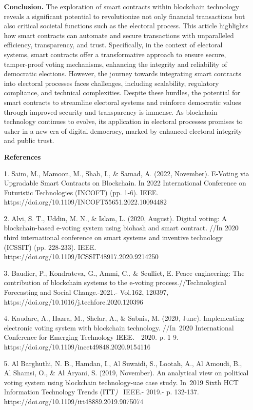 \textbf{Conclusion.} The exploration of smart contracts within
blockchain technology reveals a significant potential to revolutionize
not only financial transactions but also critical societal functions
such as the electoral process. This article highlights how smart
contracts can automate and secure transactions with unparalleled
efficiency, transparency, and trust. Specifically, in the context of
electoral systems, smart contracts offer a transformative approach to
ensure secure, tamper-proof voting mechanisms, enhancing the integrity
and reliability of democratic elections. However, the journey towards
integrating smart contracts into electoral processes faces challenges,
including scalability, regulatory compliance, and technical
complexities. Despite these hurdles, the potential for smart contracts
to streamline electoral systems and reinforce democratic values through
improved security and transparency is immense. As blockchain technology
continues to evolve, its application in electoral processes promises to
usher in a new era of digital democracy, marked by enhanced electoral
integrity and public trust.

\textbf{References}

1. Saim, M., Mamoon, M., Shah, I., \& Samad, A. (2022, November).
E-Voting via Upgradable Smart Contracts on Blockchain. In 2022
International Conference on Futuristic Technologies (INCOFT) (pp. 1-6).
IEEE. https://doi.org/10.1109/INCOFT55651.2022.10094482

2. Alvi, S. T., Uddin, M. N., \& Islam, L. (2020, August). Digital
voting: A blockchain-based e-voting system using biohash and smart
contract. //In 2020 third international conference on smart systems and
inventive technology (ICSSIT) (pp. 228-233). IEEE.
https://doi.org/10.1109/ICSSIT48917.2020.9214250

3. Baudier, P., Kondrateva, G., Ammi, C., \& Seulliet, E. Peace
engineering: The contribution of blockchain systems to the e-voting
process.//Technological Forecasting and Social Change.-2021.- Vol.162,
120397, https://doi.org/10.1016/j.techfore.2020.120396

4. Kaudare, A., Hazra, M., Shelar, A., \& Sabnis, M. (2020, June).
Implementing electronic voting system with blockchain technology.
//In~2020 International Conference for Emerging Technology IEEE. -
2020\emph{.-}p. 1-9. https://doi.org/10.1109/incet49848.2020.9154116

5. Al Barghuthi, N. B., Hamdan, I., Al Suwaidi, S., Lootah, A., Al
Amoudi, B., Al Shamsi, O., \& Al Aryani, S. (2019, November). An
analytical view on political voting system using blockchain
technology-uae case study. In~2019 Sixth HCT Information Technology
Trends (ITT\emph{)}~ IEEE.- 2019.- p. 132-137.
https://doi.org/10.1109/itt48889.2019.9075074

